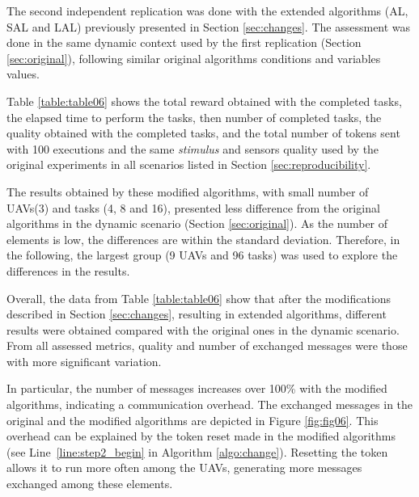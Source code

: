 The second independent replication was done with the extended algorithms (AL, SAL and LAL) previously presented in Section \ref{sec:changes}. The assessment was done in the same dynamic context used by the first replication (Section \ref{sec:original}), following similar original algorithms conditions and variables values.

Table \ref{table:table06} shows the total reward obtained with the completed tasks, the elapsed time to perform the tasks, then number of completed tasks, the quality obtained with the completed tasks, and the total number of tokens sent with 100 executions and the same \textit{stimulus} and sensors quality used by the original experiments in all scenarios listed in Section \ref{sec:reproducibility}. 



The results obtained by these modified algorithms, with small number of UAVs(3) and tasks (4, 8 and 16), presented less difference from the original algorithms in the dynamic scenario (Section \ref{sec:original}). As the number of elements is low, the differences are within the standard deviation. Therefore, in the following, the largest group (9 UAVs and 96 tasks) was used to explore the differences in the results. 

Overall, the data from Table \ref{table:table06} show that after the modifications described in Section \ref{sec:changes}, resulting in extended algorithms, different results were obtained  compared with the original ones in the dynamic scenario. From all assessed metrics, quality and number of exchanged messages were those with more significant variation.

In particular, the number of messages increases over 100\% with the modified algorithms, indicating a communication overhead. The exchanged messages in the original and the modified algorithms are depicted in Figure \ref{fig:fig06}. This overhead can be explained by the token reset made in the modified algorithms (see Line~\ref{line:step2_begin} in Algorithm \ref{algo:change}). Resetting the token allows it to run more often among the UAVs, generating more messages exchanged among these elements.

